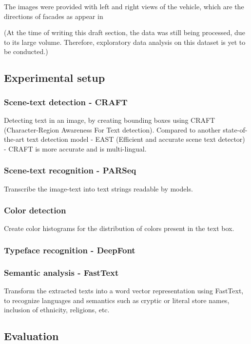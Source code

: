 The images were provided with left and right views of the vehicle, which are the directions of facades as appear in 

(At the time of writing this draft section, the data was still being processed, due to its large volume. Therefore, exploratory data analysis on this dataset is yet to be conducted.)

\subsection{Experimental setup}
\subsubsection{Scene-text detection - CRAFT}
Detecting text in an image, by creating bounding boxes using CRAFT (Character-Region Awareness For Text detection). Compared to another state-of-the-art text detection model - EAST (Efficient and accurate scene text detector) - CRAFT is more accurate and is multi-lingual.

\subsubsection{Scene-text recognition - PARSeq}
Transcribe the image-text into text strings readable by models.

\subsubsection{Color detection}
Create color histograms for the distribution of colors present in the text box.

\subsubsection{Typeface recognition - DeepFont} 

\subsubsection{Semantic analysis - FastText}
Transform the extracted texts into a word vector representation using FastText, to recognize languages and semantics such as cryptic or literal store names, inclusion of ethnicity, religions, etc.

\subsection{Evaluation}

